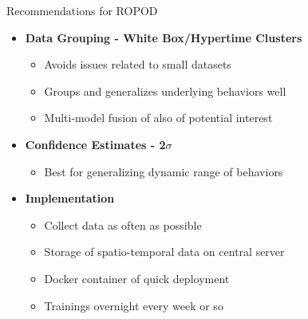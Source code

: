 \documentclass{beamer}
\begin{document}
\begin{frame}[t]{Recommendations for ROPOD}

  \begin{itemize}
  \setlength\itemsep{1.00em}
    \item \textbf{Data Grouping - White Box/Hypertime Clusters}
      \begin{itemize}
        \item Avoids issues related to small datasets
        \item Groups and generalizes underlying behaviors well
        \item Multi-model fusion of also of potential interest
      \end{itemize}

    \item \textbf{Confidence Estimates - 2$\sigma$}
      \begin{itemize}
        \item Best for generalizing dynamic range of behaviors
      \end{itemize}

    \item \textbf{Implementation}
      \begin{itemize}
        \item Collect data as often as possible
        \item Storage of spatio-temporal data on central server
        \item Docker container of quick deployment
        \item Trainings overnight every week or so
      \end{itemize}

  \end{itemize}

\end{frame}
\end{document}
